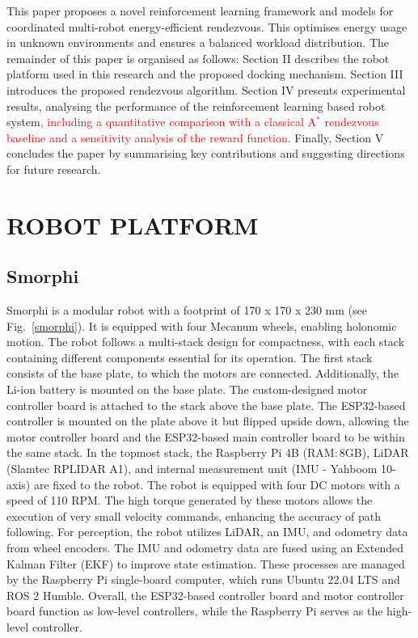 \documentclass[journal]{IEEEtran}
\begin{document}
This paper proposes a novel reinforcement learning framework and models for coordinated multi-robot energy-efficient rendezvous. This optimises energy usage in unknown environments and ensures a balanced workload distribution. The remainder of this paper is organised as follows: Section II describes the robot platform used in this research and the proposed docking mechanism. Section III introduces the proposed rendezvous algorithm. Section IV presents experimental results, analysing the performance of the reinforcement learning based robot system\textcolor{red}{, including a quantitative comparison with a classical A$^{*}$ rendezvous baseline and a sensitivity analysis of the reward function}. Finally, Section V concludes the paper by summarising key contributions and suggesting directions for future research.


\section{ROBOT PLATFORM}

\subsection{Smorphi}

Smorphi is a modular robot with a footprint of 170 x 170 x 230 mm (see Fig.~\ref{smorphi}). It is equipped with four Mecanum wheels, enabling holonomic motion. The robot follows a multi-stack design for compactness, with each stack containing different components essential for its operation. The first stack consists of the base plate, to which the motors are connected. Additionally, the Li-ion battery is mounted on the base plate. The custom-designed motor controller board is attached to the stack above the base plate. The ESP32-based controller is mounted on the plate above it but flipped upside down, allowing the motor controller board and the ESP32-based main controller board to be within the same stack. In the topmost stack, the Raspberry Pi 4B (RAM:\,8GB), LiDAR (Slamtec RPLIDAR A1), and internal measurement unit (IMU - Yahboom 10-axis) are fixed to the robot. The robot is equipped with four DC motors with a speed of 110 RPM. The high torque generated by these motors allows the execution of very small velocity commands, enhancing the accuracy of path following. For perception, the robot utilizes LiDAR, an IMU, and odometry data from wheel encoders. The IMU and odometry data are fused using an Extended Kalman Filter (EKF) to improve state estimation. These processes are managed by the Raspberry Pi single-board computer, which runs Ubuntu 22.04 LTS and ROS 2 Humble. Overall, the ESP32-based controller board and motor controller board function as low-level controllers, while the Raspberry Pi serves as the high-level controller.
\end{document}
